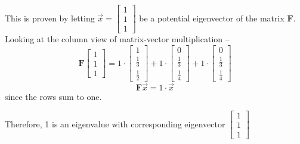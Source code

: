 \begin{enumerate}
{	This is proven by letting $\vec{x} = \begin{bmatrix} 1 \\ 1 \\ 1 \end{bmatrix}$ be a potential eigenvector of the matrix $\mathbf{F}$.
	Looking at the column view of matrix-vector multiplication -- 
	$$\mathbf{F}\begin{bmatrix} 1 \\ 1 \\ 1 \end{bmatrix}
	 = 1 \cdot \begin{bmatrix} 1 \\ \frac{1}{3} \\ \frac{1}{2} \end{bmatrix} + 1\cdot\begin{bmatrix} 0 \\ \frac{1}{3} \\ \frac{1}{4} \end{bmatrix} + 1\cdot\begin{bmatrix} 0 \\ \frac{1}{3} \\ \frac{1}{4}\end{bmatrix}$$ 
	 $$\mathbf{F}\vec{x} = 1\cdot\vec{x}$$ since the rows sum to one.

	 Therefore, 1 is an eigenvalue with corresponding eigenvector $\begin{bmatrix} 1 \\ 1 \\ 1 \end{bmatrix}$
}


\end{enumerate}
